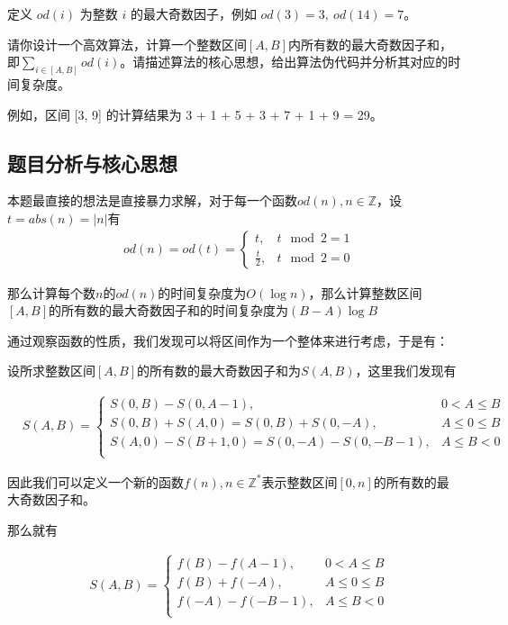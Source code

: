 \documentclass{article}
\begin{document}

定义 $od(i)$ 为整数 $i$ 的最大奇数因子，例如 $od(3) = 3,\ od(14) = 7$。


请你设计一个高效算法，计算一个整数区间$ [A, B] $内所有数的最大奇数因子和，即$\sum_{i \in [A,B]} od(i)$。请描述算法的核心思想，给出算法伪代码并分析其对应的时间复杂度。

例如，区间 [3, 9] 的计算结果为 3 + 1 + 5 + 3 + 7 + 1 + 9 = 29。

\subsection{题目分析与核心思想}

本题最直接的想法是直接暴力求解，对于每一个函数$od(n), n \in \mathds{Z}$，设$t = abs(n) = |n|$有
\begin{align*}
    &od(n) = od(t) = \begin{cases}
        t, & t\mod2 = 1\\
        \frac{t}{2}, & t\mod2=0
    \end{cases} 
\end{align*}

那么计算每个数$n$的$od(n)$的时间复杂度为$O(\log n)$，那么计算整数区间$[A,B]$的所有数的最大奇数因子和的时间复杂度为$(B-A)\log B$

通过观察函数的性质，我们发现可以将区间作为一个整体来进行考虑，于是有：

设所求整数区间$[A,B]$的所有数的最大奇数因子和为$S(A,B)$，这里我们发现有

\begin{align*}
    &S(A,B) = 
    \begin{cases}
     S(0,B) - S(0, A-1), & 0 < A \le B\\
     S(0,B) + S(A, 0) = S(0, B) + S(0, -A), & A \le 0 \le B\\
     S(A,0) - S(B+1, 0) = S(0, -A) - S(0, -B-1), & A \le B < 0 \\
    \end{cases}
\end{align*}

因此我们可以定义一个新的函数$f(n),n\in \mathds{Z}^*$表示整数区间$[0, n]$的所有数的最大奇数因子和。

那么就有

\begin{align*}
    &S(A,B) = 
    \begin{cases}
     f(B) - f(A-1), & 0 < A \le B\\
     f(B) + f(-A), & A \le 0 \le B\\
     f(-A) - f(-B-1), & A \le B < 0 \\
    \end{cases}
\end{align*}
\end{document}
